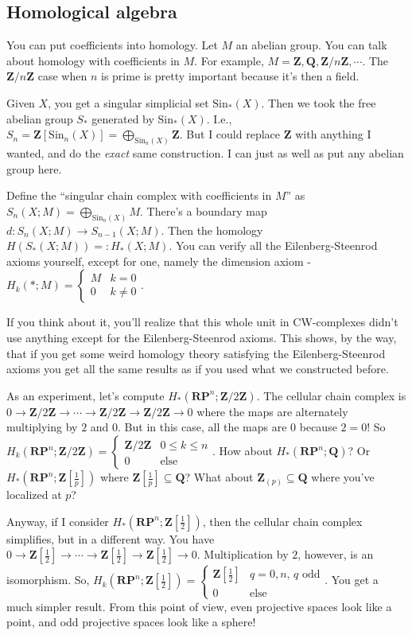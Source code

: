 \documentclass{amsart}
\theoremstyle{theorem}
\theoremstyle{definition}
\newcommand{\RP}{\mathbf{RP}}
\def\QQ{\mathbf Q}\def\RR{\mathbf R}\def\SS{\mathbb S}\def\TT{\mathbb T}
\newcommand{\Z}{\mathbf Z}
\newcommand{\Sin}{\mathrm{Sin}}
\begin{document}
\subsection{Homological algebra}
You can put coefficients into homology. Let $M$ an abelian group. You can talk about homology with coefficients in $M$. For example, $M=\Z,\QQ,\Z/n\Z,\cdots$. The $\Z/n\Z$ case when $n$ is prime is pretty important because it's then a field.

Given $X$, you get a singular simplicial set $\Sin_\ast(X)$. Then we took the free abelian group $S_\ast$ generated by $\Sin_\ast(X)$. I.e., $S_n=\Z[\Sin_n(X)]=\bigoplus_{\Sin_n(X)}\Z$. But I could replace $\Z$ with anything I wanted, and do the \emph{exact} same construction. I can just as well as put any abelian group here.

Define the ``singular chain complex with coefficients in $M$'' as $S_n(X;M)=\bigoplus_{\Sin_n(X)}M$. There's a boundary map $d:S_n(X;M)\to S_{n-1}(X;M)$. Then the homology $ H(S_\ast(X;M))=: H_\ast(X;M)$. You can verify all the Eilenberg-Steenrod axioms yourself, except for one, namely the dimension axiom - $ H_k(\ast;M)=\begin{cases}M & k=0 \\ 0 & k\neq 0\end{cases}$.

If you think about it, you'll realize that this whole unit in CW-complexes didn't use anything except for the Eilenberg-Steenrod axioms. This shows, by the way, that if you get some weird homology theory satisfying the Eilenberg-Steenrod axioms you get all the same results as if you used what we constructed before.

As an experiment, let's compute $ H_\ast(\RP^n;\Z/2\Z)$. The cellular chain complex is $0\to \Z/2\Z\to\cdots\to\Z/2\Z\to\Z/2\Z\to 0$ where the maps are alternately multiplying by $2$ and $0$. But in this case, all the maps are $0$ because $2=0$! So $ H_k(\RP^n;\Z/2\Z)=\begin{cases}\Z/2\Z & 0\leq k\leq n \\ 0 & \text{else}\end{cases}$. How about $ H_\ast(\RP^n;\QQ)$? Or $ H_\ast(\RP^n;\Z[\frac{1}{p}])$ where $\Z[\frac{1}{p}]\subseteq \QQ$? What about $\Z_{(p)}\subseteq \QQ$ where you've localized at $p$?

Anyway, if I consider $ H_\ast(\RP^n;\Z[\frac{1}{2}])$, then the cellular chain complex simplifies, but in a different way. You have $0\to \Z[\frac{1}{2}] \to\cdots\to \Z[\frac{1}{2}] \to \Z[\frac{1}{2}] \to 0$. Multiplication by $2$, however, is an isomorphism. So, $ H_k(\RP^n;\Z[\frac{1}{2}])=\begin{cases}\Z[\frac{1}{2}] & q=0,n,\, q \text{ odd} \\ 0 & \text{else}\end{cases}$. You get a much simpler result. From this point of view, even projective spaces look like a point, and odd projective spaces look like a sphere!
\end{document}
